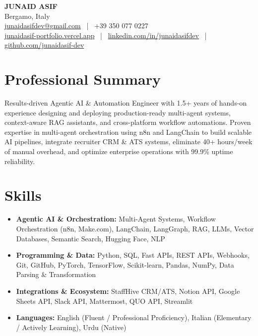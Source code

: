 \documentclass[letterpaper,10.5pt]{article}
\begin{document}
\begin{center}
    {\Huge \textbf{JUNAID ASIF}} \\ \vspace{4pt}
    Bergamo, Italy \\ 
    \href{mailto:junaidasifdev@gmail.com}{junaidasifdev@gmail.com} ~|~ +39 350 077 0227 \\ 
    \href{https://junaidasif-portfolio.vercel.app}{junaidasif-portfolio.vercel.app} ~|~ \href{https://www.linkedin.com/in/junaidasifdev}{linkedin.com/in/junaidasifdev} ~|~ \href{https://github.com/junaidasif-dev}{github.com/junaidasif-dev}
\end{center}

\section{Professional Summary}
Results-driven Agentic AI \& Automation Engineer with 1.5+ years of hands-on experience designing and deploying production-ready multi-agent systems, context-aware RAG assistants, and cross-platform workflow automations. Proven expertise in multi-agent orchestration using n8n and LangChain to build scalable AI pipelines, integrate recruiter CRM \& ATS systems, eliminate 40+ hours/week of manual overhead, and optimize enterprise operations with 99.9\% uptime reliability.
\section{Skills}
\begin{itemize}[leftmargin=0.15in, label={}]
    \item \textbf{Agentic AI \& Orchestration:} Multi-Agent Systems, Workflow Orchestration (n8n, Make.com), LangChain, LangGraph, RAG, LLMs, Vector Databases, Semantic Search, Hugging Face, NLP
    \item \textbf{Programming \& Data:} Python, SQL, Fast APIs, REST APIs, Webhooks, Git, GitHub, PyTorch, TensorFlow, Scikit-learn, Pandas, NumPy, Data Parsing \& Transformation
    \item \textbf{Integrations \& Ecosystem:} StaffHive CRM/ATS, Notion API, Google Sheets API, Slack API, Mattermost, QUO API, Streamlit
    \item \textbf{Languages:} English (Fluent / Professional Proficiency), Italian (Elementary / Actively Learning), Urdu (Native)
\end{itemize}
\end{document}
